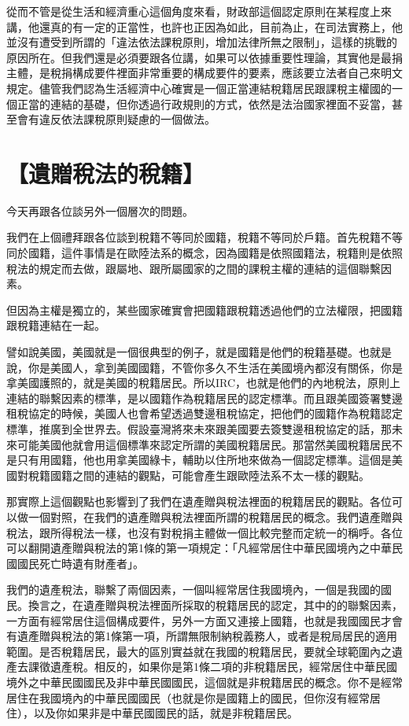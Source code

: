 \documentclass[]{ctexbook}
\begin{document}
從而不管是從生活和經濟重心這個角度來看，財政部這個認定原則在某程度上來講，他還真的有一定的正當性，也許也正因為如此，目前為止，在司法實務上，他並沒有遭受到所謂的「違法依法課稅原則，增加法律所無之限制」，這樣的挑戰的原因所在。但我們還是必須要跟各位講，如果可以依據重要性理論，其實他是最捐主體，是稅捐構成要件裡面非常重要的構成要件的要素，應該要立法者自己來明文規定。儘管我們認為生活經濟中心確實是一個正當連結稅籍居民跟課稅主權國的一個正當的連結的基礎，但你透過行政規則的方式，依然是法治國家裡面不妥當，甚至會有違反依法課稅原則疑慮的一個做法。

\hypertarget{ux907aux8d08ux7a05ux6cd5ux7684ux7a05ux7c4d}{%
\section{【遺贈稅法的稅籍】}\label{ux907aux8d08ux7a05ux6cd5ux7684ux7a05ux7c4d}}

今天再跟各位談另外一個層次的問題。

我們在上個禮拜跟各位談到稅籍不等同於國籍，稅籍不等同於戶籍。首先稅籍不等同於國籍，這件事情是在歐陸法系的概念，因為國籍是依照國籍法，稅籍則是依照稅法的規定而去做，跟屬地、跟所屬國家的之間的課稅主權的連結的這個聯繫因素。

但因為主權是獨立的，某些國家確實會把國籍跟稅籍透過他們的立法權限，把國籍跟稅籍連結在一起。

譬如說美國，美國就是一個很典型的例子，就是國籍是他們的稅籍基礎。也就是說，你是美國人，拿到美國國籍，不管你多久不生活在美國境內都沒有關係，你是拿美國護照的，就是美國的稅籍居民。所以IRC，也就是他們的內地稅法，原則上連結的聯繫因素的標準，是以國籍作為稅籍居民的認定標準。而且跟美國簽署雙邊租稅協定的時候，美國人也會希望透過雙邊租稅協定，把他們的國籍作為稅籍認定標準，推廣到全世界去。假設臺灣將來未來跟美國要去簽雙邊租稅協定的話，那未來可能美國他就會用這個標準來認定所謂的美國稅籍居民。那當然美國稅籍居民不是只有用國籍，他也用拿美國綠卡，輔助以住所地來做為一個認定標準。這個是美國對稅籍國籍之間的連結的觀點，可能會產生跟歐陸法系不太一樣的觀點。

那實際上這個觀點也影響到了我們在遺產贈與稅法裡面的稅籍居民的觀點。各位可以做一個對照，在我們的遺產贈與稅法裡面所謂的稅籍居民的概念。我們遺產贈與稅法，跟所得稅法一樣，也沒有對稅捐主體做一個比較完整而定統一的稱呼。各位可以翻開遺產贈與稅法的第1條的第一項規定：「凡經常居住中華民國境內之中華民國國民死亡時遺有財產者」。

我們的遺產稅法，聯繫了兩個因素，一個叫經常居住我國境內，一個是我國的國民。換言之，在遺產贈與稅法裡面所採取的稅籍居民的認定，其中的的聯繫因素，一方面有經常居住這個構成要件，另外一方面又連接上國籍，也就是我國國民才會有遺產贈與稅法的第1條第一項，所謂無限制納稅義務人，或者是稅局居民的適用範圍。是否稅籍居民，最大的區別實益就在我國的稅籍居民，要就全球範圍內之遺產去課徵遺產稅。相反的，如果你是第1條二項的非稅籍居民，經常居住中華民國境外之中華民國國民及非中華民國國民，這個就是非稅籍居民的概念。你不是經常居住在我國境內的中華民國國民（也就是你是國籍上的國民，但你沒有經常居住），以及你如果非是中華民國國民的話，就是非稅籍居民。
\end{document}
